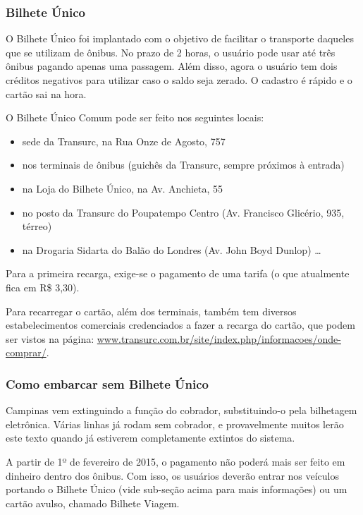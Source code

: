 \subsubsection*{Bilhete Único}

O Bilhete Único foi implantado com o objetivo de facilitar o transporte daqueles
que se utilizam de ônibus. No prazo de 2 horas, o usuário pode usar até três ônibus 
pagando apenas uma passagem. Além disso, agora o usuário tem dois créditos negativos 
para utilizar caso o saldo seja zerado. O cadastro é rápido e o cartão sai na hora.

O Bilhete Único Comum pode ser feito nos seguintes locais:
\begin{itemize}
  \item sede da Transurc, na Rua Onze de Agosto, 757
  \item nos terminais de ônibus (guichês da Transurc, sempre próximos à entrada)
  \item na Loja do Bilhete Único, na Av. Anchieta, 55
  \item no posto da Transurc do Poupatempo Centro (Av. Francisco Glicério, 935, térreo)
  \item na Drogaria Sidarta do Balão do Londres (Av. John Boyd Dunlop) \ldots
\end{itemize}

Para a primeira recarga, exige-se o pagamento de uma tarifa (o que atualmente 
fica em R\$ 3,30).

Para recarregar o cartão, além dos terminais, também tem diversos
estabelecimentos comerciais credenciados a fazer a recarga do cartão, que podem
ser vistos na página: \url{www.transurc.com.br/site/index.php/informacoes/onde-comprar/}.

\subsubsection*{Como embarcar sem Bilhete Único}

Campinas vem extinguindo a função do cobrador, substituindo-o pela bilhetagem 
eletrônica. Várias linhas já rodam sem cobrador, e provavelmente muitos lerão 
este texto quando já estiverem completamente extintos do sistema.

A partir de 1º de fevereiro de 2015, o pagamento não poderá mais ser feito 
em dinheiro dentro dos ônibus. Com isso, os usuários deverão entrar nos veículos 
portando o Bilhete Único (vide sub-seção acima para mais informações) ou um 
cartão avulso, chamado Bilhete Viagem.

